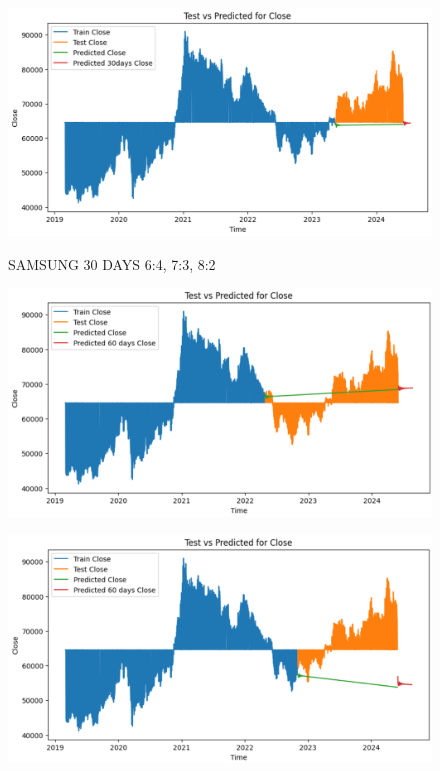 \documentclass{article}
\begin{document}
\begin{multicols}{2}
\begin{figure}[H]
\begin{minipage}{0.15\textwidth}
    \label{fig:2}
    \end{minipage}%
    \begin{minipage}{0.15\textwidth}
    \centering
    \includegraphics[width=1\textwidth]{Image/VARMA/SAMSUNG/8_2/30.png}

    \label{fig:3}
    \end{minipage}
    \caption{SAMSUNG 30 DAYS  6:4, 7:3, 8:2 }
\end{figure}

\begin{figure}[H]
    \centering
    \begin{minipage}{0.15\textwidth}
    \centering
    \includegraphics[width=1\textwidth]{Image/VARMA/SAMSUNG/6_4/60.png}
   
    \label{fig:1}
    \end{minipage}%
    \begin{minipage}{0.15\textwidth}
    \centering
    \includegraphics[width=1\textwidth]{Image/VARMA/SAMSUNG/7_3/60.png}
  

\end{minipage}
\end{figure}
\end{multicols}
\end{document}
